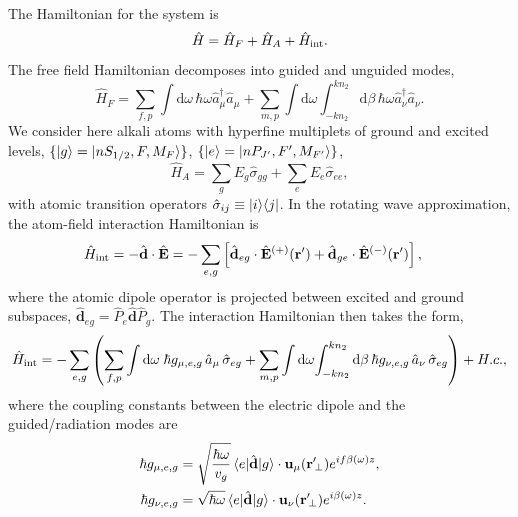 The Hamiltonian for the system is
\begin{equation}
\hat{H} = \hat{H}_F+\hat{H}_A + \hat{H}_{{\rm int}}.
\end{equation}
The free field Hamiltonian decomposes into guided and unguided modes, 
	\begin{equation}
		\hat{H}_F = \sum_{f,p}\int \mathrm{d}\omega \, \hbar \omega \hat{a}^\dagger_\mu \hat{a}_\mu 
+\sum_{m,p} \int \mathrm{d}\omega  \int_{-k n_2}^{k n_2} \mathrm{d}\beta \, \hbar \omega 
\hat{a}^\dagger_\nu \hat{a}_\nu.
	\end{equation}
We consider here alkali atoms with hyperfine multiplets of ground and excited levels, $\{ 
\lvert{g}\rangle=\lvert{nS_{1/2}, F, M_F}\rangle\}$, $\{ \lvert{e}\rangle =\lvert{nP_{J'}, F', M_{F'}}\rangle\}$,
	\begin{equation}
		\hat{H}_A  = \sum_g E_g \hat{\sigma}_{gg} + \sum_e E_e \hat{\sigma}_{ee},
	\end{equation}
with atomic transition operators $\hat{\sigma}_{ij} \equiv \lvert{i}\rangle\langle{j}\rvert$.  In the rotating wave approximation, the atom-field interaction Hamiltonian is
	\begin{align}
		\hat{H}_{{\rm int}} &= -\hat{\mathbf{d}}\cdot \hat{\mathbf{E}} =-\sum_{e,g} \left[ \hat{\mathbf{d}}_{eg}\cdot 
\hat{\mathbf{E}}^{(+)}(\mathbf{r}')+\hat{\mathbf{d}}_{ge}\cdot \hat{\mathbf{E}}^{(-)}(\mathbf{r}') \right],
	\end{align}
where the atomic dipole operator is projected between excited and ground subspaces, $\hat{\mathbf{d}}_{eg}= \hat{P}_e \hat{\mathbf{d}} \hat{P}_g $. The interaction Hamiltonian then takes the form, 
\begin{equation}
	\hat{H}_{{\rm int}} = -\sum_{e,g} \left(\sum_{f,p} \int\mathrm{d}\omega \; \hbar g_{\mu, e,g}\, \hat{a}_\mu  \, 
		\hat{\sigma}_{eg}+ \sum_{m,p} \int\mathrm{d}\omega \! \int_{-kn_2}^{kn_2}\mathrm{d}\beta \,  \hbar 
g_{\nu, e,g}\, \hat{a}_\nu \, \hat{\sigma}_{eg}\right) + {H.c.},
	\end{equation}
where the coupling constants between the electric dipole and the guided/radiation modes are
\begin{subequations} \label{Eq::CouplingConstants}
	\begin{align}
		\hbar g_{\mu, e,g} &= \sqrt{\frac{\hbar \omega}{ v_g  }}\, \langle{e}\rvert \hat{\mathbf{d}} \lvert{g}\rangle 
\cdot\mathbf{u}_\mu ( \mathbf{r}'\!_\perp ) e^{i f \beta(\omega)z} , \\
		\hbar g_{\nu, e,g} &= \sqrt{  \hbar \omega } \, \langle{e}\rvert \hat{\mathbf{d}} \lvert{g}\rangle \cdot \mathbf{u}_\nu ( \mathbf{r}'\!_\perp ) e^{i\beta(\omega)z}  .
	\end{align}
\end{subequations}
